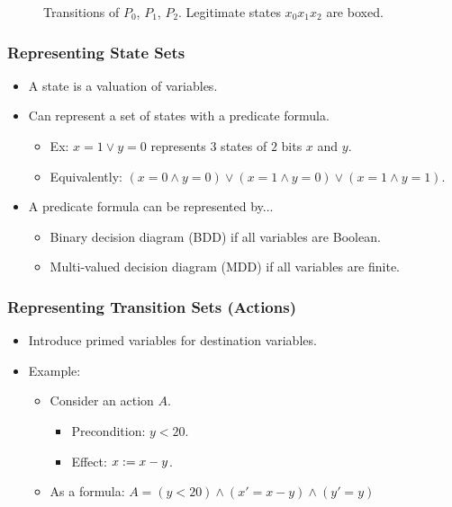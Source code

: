 \documentclass[handout]{beamer}
\begin{document}
\begin{frame}
\begin{figure}
\caption{Transitions of {\color{red!40} $P_0$}, {\color{green!50!black!75} $P_1$}, {\color{blue} $P_2$}. Legitimate states $x_0x_1x_2$ are boxed.}
\end{figure}
\end{frame}

\begin{frame}
\frametitle{Representing State Sets}
\begin{itemize}
\item A state is a valuation of variables.
\item Can represent a set of states with a predicate formula.
 \begin{itemize}
 \item Ex: $x=1\vee y=0$ represents $3$ states of $2$ bits $x$ and $y$.
 \item Equivalently: $(x=0\wedge y=0) \vee (x=1\wedge y=0) \vee (x=1\wedge y=1)$.
 \end{itemize}
\item A predicate formula can be represented by...
 \begin{itemize}
 \item Binary decision diagram (BDD) if all variables are Boolean.
 \item Multi-valued decision diagram (MDD) if all variables are finite.
 \end{itemize}
\end{itemize}
\end{frame}

\begin{frame}
\frametitle{Representing Transition Sets (Actions)}
\begin{itemize}
\item Introduce primed variables for destination variables.
\item Example:
 \begin{itemize}
 \item Consider an action $A$.
  \begin{itemize}
  \item[] Precondition: $y < 20$.
  \item[] Effect: $x := x - y$.
  \end{itemize}
 \item As a formula: $A = (y < 20) \wedge (x' = x - y) \wedge (y' = y)$
 \end{itemize}
\end{itemize}
\end{frame}
\end{document}
